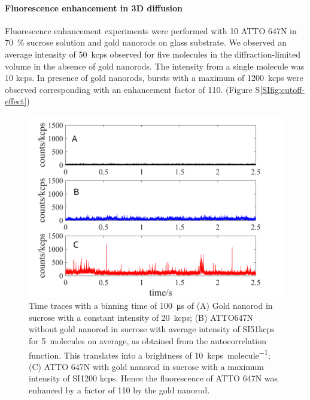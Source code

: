 \paragraph*{Fluorescence enhancement in 3D diffusion}
Fluorescence enhancement experiments were performed with \SI{10}{\nM} ATTO 647N in \SI{70}{\percent} sucrose solution and gold nanorods on glass substrate.
We observed an average intensity of \SI{50}{kcps} observed for five molecules in the diffraction-limited volume in the absence of gold nanorods.
The intensity from a single molecule was 10 kcps.
In presence of gold nanorods, bursts with a maximum of \SI{1200}{kcps} were observed corresponding with an enhancement factor of 110. (Figure S\ref{SIfig:cutoff-effect})
\begin{figure}%
  \centering
  \includegraphics[width=\textwidth]{3D_enhc}
  \makeatletter
  \renewcommand{\fnum@figure}{\figurename~S\thefigure}
  \makeatother{}
  \caption{Time traces with a binning time of \SI{100}{\us} of (A) Gold nanorod in sucrose with a constant intensity of \SI{20}{kcps}; (B) ATTO647N without gold nanorod in sucrose with average intensity of SI{51}{kcps} for \SI{5}{ molecules} on average, as obtained from the autocorrelation function.
  This translates into a brightness of \SI{10}{ kcps\per molecule}; (C) ATTO 647N with gold nanorod in sucrose with a maximum intensity of SI{1200}{ kcps}.
  Hence the fluorescence of ATTO 647N was enhanced by a factor of 110 by the gold nanorod.}
  \label{SIfig:3D-enhc}
\end{figure}

